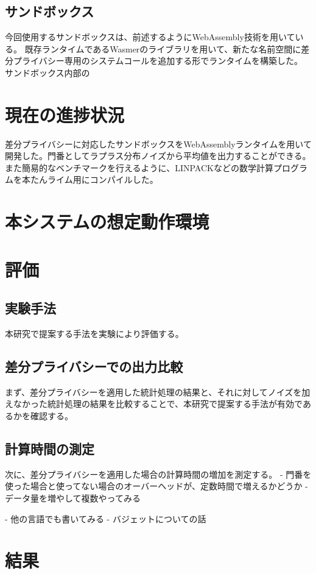 \documentclass[a4paper,11pt]{jreport}
\begin{document}
\subsection{サンドボックス}

今回使用するサンドボックスは、前述するようにWebAssembly技術を用いている。
既存ランタイムであるWasmerのライブラリを用いて、新たな名前空間に差分プライバシー専用のシステムコールを追加する形でランタイムを構築した。
サンドボックス内部の

\section{現在の進捗状況}

差分プライバシーに対応したサンドボックスをWebAssemblyランタイムを用いて開発した。門番としてラプラス分布ノイズから平均値を出力することができる。
また簡易的なベンチマークを行えるように、LINPACKなどの数学計算プログラムを本たんライム用にコンパイルした。

\section{本システムの想定動作環境}
\section{評価}
\subsection{実験手法}
本研究で提案する手法を実験により評価する。

\subsection{差分プライバシーでの出力比較}
まず、差分プライバシーを適用した統計処理の結果と、それに対してノイズを加えなかった統計処理の結果を比較することで、本研究で提案する手法が有効であるかを確認する。

\subsection{計算時間の測定}
次に、差分プライバシーを適用した場合の計算時間の増加を測定する。
- 門番を使った場合と使ってない場合のオーバーヘッドが、定数時間で増えるかどうか
    - データ量を増やして複数やってみる

- 他の言語でも書いてみる
- バジェットについての話

\section{結果}
\end{document}

